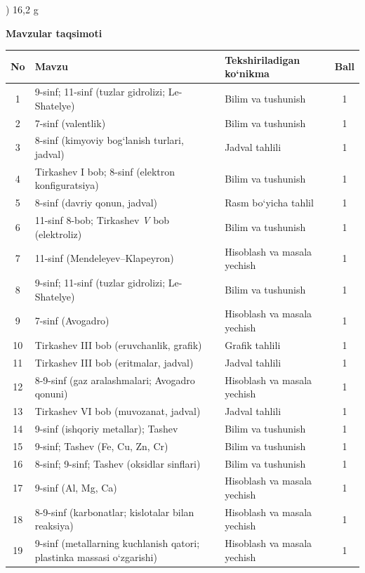 \documentclass[11pt,a4paper]{article}
\begin{document}
) 16,2 g\par
\par\bigskip\noindent\textbf{Mavzular taqsimoti}\par\smallskip
{\small\noindent\begin{longtable}{|c|p{7.2cm}|p{5.4cm}|c|}\hline \textbf{No} & \textbf{Mavzu} & \textbf{Tekshiriladigan ko`nikma} & \textbf{Ball}\\\hline
1 & 9-sinf; 11-sinf (tuzlar gidrolizi; Le-Shatelye) & Bilim va tushunish & 1\\\hline
2 & 7-sinf (valentlik) & Bilim va tushunish & 1\\\hline
3 & 8-sinf (kimyoviy bog`lanish turlari, jadval) & Jadval tahlili & 1\\\hline
4 & Tirkashev I bob; 8-sinf (elektron konfiguratsiya) & Bilim va tushunish & 1\\\hline
5 & 8-sinf (davriy qonun, jadval) & Rasm bo`yicha tahlil & 1\\\hline
6 & 11-sinf 8-bob; Tirkashev \textit{V} bob (elektroliz) & Bilim va tushunish & 1\\\hline
7 & 11-sinf (Mendeleyev--Klapeyron) & Hisoblash va masala yechish & 1\\\hline
8 & 9-sinf; 11-sinf (tuzlar gidrolizi; Le-Shatelye) & Bilim va tushunish & 1\\\hline
9 & 7-sinf (Avogadro) & Hisoblash va masala yechish & 1\\\hline
10 & Tirkashev III bob (eruvchanlik, grafik) & Grafik tahlili & 1\\\hline
11 & Tirkashev III bob (eritmalar, jadval) & Jadval tahlili & 1\\\hline
12 & 8-9-sinf (gaz aralashmalari; Avogadro qonuni) & Hisoblash va masala yechish & 1\\\hline
13 & Tirkashev VI bob (muvozanat, jadval) & Jadval tahlili & 1\\\hline
14 & 9-sinf (ishqoriy metallar); Tashev & Bilim va tushunish & 1\\\hline
15 & 9-sinf; Tashev (Fe, Cu, Zn, Cr) & Bilim va tushunish & 1\\\hline
16 & 8-sinf; 9-sinf; Tashev (oksidlar sinflari) & Bilim va tushunish & 1\\\hline
17 & 9-sinf (Al, Mg, Ca) & Hisoblash va masala yechish & 1\\\hline
18 & 8-9-sinf (karbonatlar; kislotalar bilan reaksiya) & Hisoblash va masala yechish & 1\\\hline
19 & 9-sinf (metallarning kuchlanish qatori; plastinka massasi o`zgarishi) & Hisoblash va masala yechish & 1\\\hline

\end{longtable}}
\end{document}
